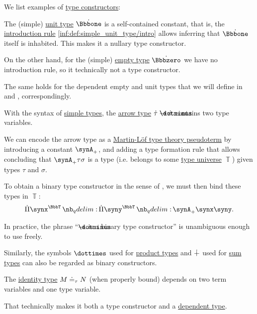 \begin{example}\label{ex:con:type_constructor}
  We list examples of \hyperref[con:type_constructor]{type constructors}:
  \begin{thmenum}
     The (simple) \hyperref[def:simple_unit_type]{unit type} \( \syn\Bbbone \) is a self-contained constant, that is, the \hyperref[rem:type_theory_rule_classification/intro]{introduction rule} \ref{inf:def:simple_unit_type/intro} allows inferring that \( \syn\Bbbone \) itself is inhabited. This makes it a nullary type constructor.

    On the other hand, for the (simple) \hyperref[def:simple_empty_type]{empty type} \( \syn\Bbbzero \) we have no introduction rule, so it technically not a type constructor.

    The same holds for the dependent empty and unit types that we will define in  and , correspondingly.

     With the syntax of \hyperref[def:simple_type]{simple types}, the \hyperref[def:arrow_type]{arrow type} \( \syn\tau \synimplies \syn\sigma \) contains two type variables.

    We can encode the arrow type as a \hyperref[rem:pseudoterm_schemas]{Martin-L\"of type theory pseudoterm} by introducing a constant \( \synA_+ \), and adding a type formation rule that allows concluding that \( \synA_+ \tau \sigma \) is a type (i.e. belongs to some \hyperref[con:type_universe]{type universe} \( \BbbT \)) given types \( \tau \) and \( \sigma \).

    To obtain a binary type constructor in the sense of , we must then bind these types in \( \BbbT \):
    \begin{equation*}
      \qprod {\synx^{\BbbT}} \qprod {\syny^{\BbbT}} \synA_+ \synx \syny.
    \end{equation*}

    In practice, the phrase \enquote{\( {\synimplies} \) is a binary type constructor} is unambiguous enough to use freely.

    Similarly, the symbols \( {\syntimes} \) used for \hyperref[def:simple_product_type]{product types} and \( {\mathbin{\dotplus}} \) used for \hyperref[def:simple_sum_type]{sum types} can also be regarded as binary constructors.

     The \hyperref[def:identity_type]{identity type} \( M \doteq_\tau N \) (when properly bound) depends on two term variables and one type variable.

    That technically makes it both a type constructor and a \hyperref[con:dependent_type]{dependent type}.
  \end{thmenum}
\end{example}

